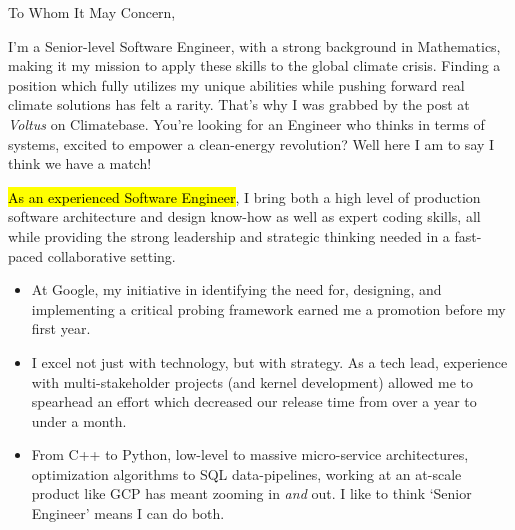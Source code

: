 \documentclass{tc_cv}
\begin{document}

\begin{adjustwidth}{40pt}{40pt}
  \large

  To Whom It May Concern, \par \bigbreak

  I'm a Senior-level Software Engineer, with a strong background in
  Mathematics, making it my mission to apply these skills to the global climate
  crisis. Finding a position which fully utilizes my unique abilities while
  pushing forward real climate solutions has felt a rarity. That's why I was
  grabbed by the post at \emph{Voltus} on Climatebase. You're looking for an
  Engineer who thinks in terms of systems, excited to empower a clean-energy
  revolution? Well here I am to say I think we have a match! \medbreak

  \hl{As an experienced Software Engineer}, I bring both a high level of
  production software architecture and design know-how as well as expert coding
  skills, all while providing the strong leadership and strategic thinking
  needed in a fast-paced collaborative setting.
  \begin{itemize}

    \item At Google, my initiative in identifying the need for, designing, and
      implementing a critical probing framework earned me a promotion before my
      first year. %

    \item I excel not just with technology, but with strategy. As a tech lead,
      experience with multi-stakeholder projects (and kernel development)
      allowed me to spearhead an effort which decreased our release time from
      over a year to under a month.

    \item From C++ to Python, low-level to massive micro-service architectures,
      optimization algorithms to SQL data-pipelines, working at an at-scale
      product like GCP has meant zooming in \emph{and} out. I like to think
      `Senior Engineer' means I can do both.


\end{itemize}
\end{adjustwidth}
\end{document}
